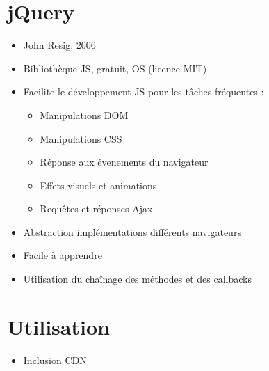 \hypertarget{jquery}{%
\section{jQuery}\label{jquery}}

\begin{itemize}
\tightlist
\item
  John Resig, 2006
\item
  Bibliothèque JS, gratuit, OS (licence MIT)
\item
  Facilite le développement JS pour les tâches fréquentes :

  \begin{itemize}
  \tightlist
  \item
    Manipulations DOM
  \item
    Manipulations CSS
  \item
    Réponse aux évenements du navigateur
  \item
    Effets visuels et animations
  \item
    Requêtes et réponses Ajax
  \end{itemize}
\item
  Abstraction implémentations différents navigateurs
\item
  Facile à apprendre
\item
  Utilisation du chaînage des méthodes et des callbacks
\end{itemize}

\hypertarget{utilisation}{%
\section{Utilisation}\label{utilisation}}

\begin{itemize}
\tightlist
\item
  Inclusion \href{http://jquery.com/download/\#other-cdns}{CDN}
\end{itemize}

\begin{otherlanguage}{english}

\begin{Shaded}
\begin{Highlighting}[]
\OperatorTok{<}\OperatorTok{=}\OperatorTok{>}\OperatorTok{>}
\end{Highlighting}
\end{Shaded}

\end{otherlanguage}

